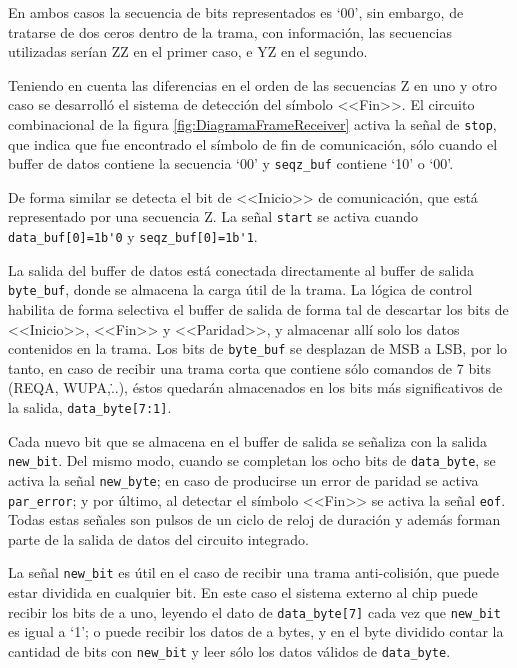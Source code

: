 En ambos casos la secuencia de bits representados es `00', sin 
embargo, de tratarse de dos ceros dentro de la trama, con información, 
las secuencias utilizadas serían ZZ en el primer caso, e YZ en el 
segundo. 

Teniendo en cuenta las diferencias en el orden de las secuencias Z en 
uno y otro caso se desarrolló el sistema de detección del símbolo 
<<Fin>>. El circuito combinacional de la figura 
\ref{fig:DiagramaFrameReceiver} activa la señal de \lstinline{stop},
que indica que fue encontrado el símbolo de fin de comunicación, 
sólo cuando el buffer de datos contiene la secuencia `00' y 
\lstinline{seqz_buf} contiene `10' o `00'.

De forma similar se detecta el bit de <<Inicio>> de comunicación, 
que está representado por una secuencia Z. La señal \lstinline{start} 
se activa cuando \lstinline{data_buf[0]=1b'0} y 
\lstinline{seqz_buf[0]=1b'1}.

La salida del buffer de datos está conectada directamente al buffer de 
salida \lstinline{byte_buf}, donde se almacena la carga útil de la 
trama. La lógica de control habilita de forma selectiva el 
buffer de salida de forma tal de descartar los bits de <<Inicio>>, 
<<Fin>> y <<Paridad>>, y almacenar allí solo los datos contenidos
en la trama. Los bits de \lstinline{byte_buf} se desplazan de MSB a LSB,
por lo tanto, en caso de recibir una trama corta que contiene sólo 
comandos de 7 bits (REQA, WUPA,\...), éstos quedarán almacenados en 
los bits más significativos de la salida, \lstinline{data_byte[7:1]}.

Cada nuevo bit que se almacena en el buffer de salida se señaliza con 
la salida \lstinline{new_bit}. Del mismo modo, cuando se completan los 
ocho bits de \lstinline{data_byte}, se activa la señal 
\lstinline{new_byte}; en caso de producirse un error de paridad se 
activa \lstinline{par_error}; y por último, al detectar el símbolo 
<<Fin>> se activa la señal \lstinline{eof}. Todas estas señales son 
pulsos de un ciclo de reloj de duración y además forman parte de la 
salida de datos del circuito integrado. 

La señal \lstinline{new_bit} es útil en el caso de recibir una trama 
anti-colisión, que puede estar dividida en cualquier bit. En este caso 
el sistema externo al chip puede recibir los bits de a uno, leyendo el 
dato de \lstinline{data_byte[7]} cada vez que \lstinline{new_bit} es 
igual a `1'; o puede recibir los datos de a bytes, y en el byte 
dividido contar la cantidad de bits con \lstinline{new_bit} y leer 
sólo los datos válidos de \lstinline{data_byte}.

